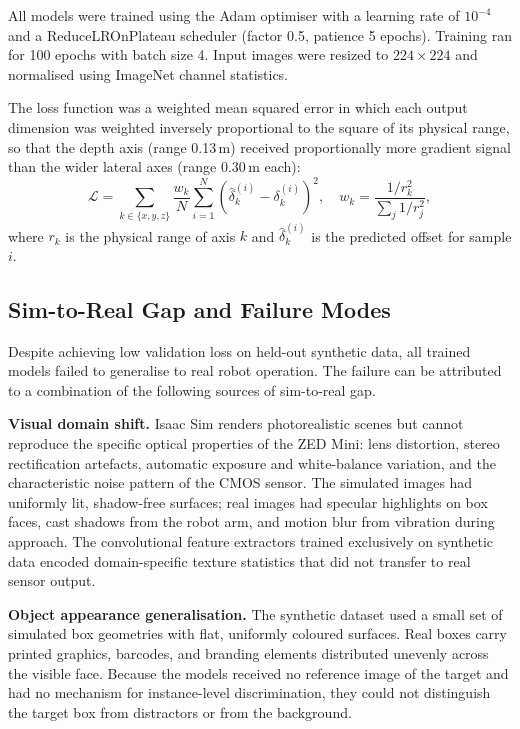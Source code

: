\documentclass[lettersize,journal]{IEEEtran}
\begin{document}
All models were trained using the Adam optimiser with a learning rate of
$10^{-4}$ and a ReduceLROnPlateau scheduler (factor 0.5, patience 5
epochs).  Training ran for 100 epochs with batch size 4.  Input images
were resized to $224\times224$ and normalised using ImageNet channel
statistics.

The loss function was a weighted mean squared error in which each output
dimension was weighted inversely proportional to the square of its
physical range, so that the depth axis (range 0.13\,m) received
proportionally more gradient signal than the wider lateral axes (range
0.30\,m each):
\begin{equation}
  \mathcal{L} = \sum_{k \in \{x,y,z\}}
    \frac{w_k}{N} \sum_{i=1}^{N} (\hat{\delta}_k^{(i)} - \delta_k^{(i)})^2,
  \quad w_k = \frac{1/r_k^2}{\sum_j 1/r_j^2},
  \label{eq:wmsed}
\end{equation}
where $r_k$ is the physical range of axis $k$ and $\hat{\delta}_k^{(i)}$
is the predicted offset for sample $i$.

\subsection{Sim-to-Real Gap and Failure Modes}

Despite achieving low validation loss on held-out synthetic data, all
trained models failed to generalise to real robot operation.  The
failure can be attributed to a combination of the following sources of
sim-to-real gap.

\textbf{Visual domain shift.}
Isaac Sim renders photorealistic scenes but cannot reproduce the specific
optical properties of the ZED Mini: lens distortion, stereo rectification
artefacts, automatic exposure and white-balance variation, and the
characteristic noise pattern of the CMOS sensor.  The simulated images
had uniformly lit, shadow-free surfaces; real images had specular
highlights on box faces, cast shadows from the robot arm, and motion blur
from vibration during approach.  The convolutional feature extractors
trained exclusively on synthetic data encoded domain-specific texture
statistics that did not transfer to real sensor output.

\textbf{Object appearance generalisation.}
The synthetic dataset used a small set of simulated box geometries with
flat, uniformly coloured surfaces.  Real boxes carry printed graphics,
barcodes, and branding elements distributed unevenly across the visible
face.  Because the models received no reference image of the target and
had no mechanism for instance-level discrimination, they could not
distinguish the target box from distractors or from the background.
\end{document}

